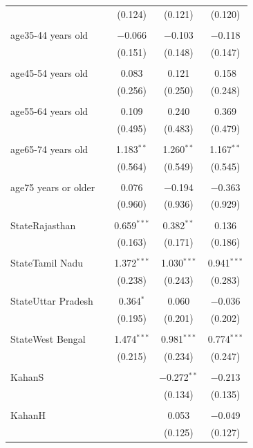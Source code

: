 \documentclass[
]{article}
\begin{document}
\begin{table}[!htbp]
\begin{tabular}{@{\extracolsep{5pt}}lcccc}
  &  & (0.124) & (0.121) & (0.120) \\ 
  & & & & \\ 
 age35-44 years old &  & $-$0.066 & $-$0.103 & $-$0.118 \\ 
  &  & (0.151) & (0.148) & (0.147) \\ 
  & & & & \\ 
 age45-54 years old &  & 0.083 & 0.121 & 0.158 \\ 
  &  & (0.256) & (0.250) & (0.248) \\ 
  & & & & \\ 
 age55-64 years old &  & 0.109 & 0.240 & 0.369 \\ 
  &  & (0.495) & (0.483) & (0.479) \\ 
  & & & & \\ 
 age65-74 years old &  & 1.183$^{**}$ & 1.260$^{**}$ & 1.167$^{**}$ \\ 
  &  & (0.564) & (0.549) & (0.545) \\ 
  & & & & \\ 
 age75 years or older &  & 0.076 & $-$0.194 & $-$0.363 \\ 
  &  & (0.960) & (0.936) & (0.929) \\ 
  & & & & \\ 
 StateRajasthan &  & 0.659$^{***}$ & 0.382$^{**}$ & 0.136 \\ 
  &  & (0.163) & (0.171) & (0.186) \\ 
  & & & & \\ 
 StateTamil Nadu &  & 1.372$^{***}$ & 1.030$^{***}$ & 0.941$^{***}$ \\ 
  &  & (0.238) & (0.243) & (0.283) \\ 
  & & & & \\ 
 StateUttar Pradesh &  & 0.364$^{*}$ & 0.060 & $-$0.036 \\ 
  &  & (0.195) & (0.201) & (0.202) \\ 
  & & & & \\ 
 StateWest Bengal &  & 1.474$^{***}$ & 0.981$^{***}$ & 0.774$^{***}$ \\ 
  &  & (0.215) & (0.234) & (0.247) \\ 
  & & & & \\ 
 KahanS &  &  & $-$0.272$^{**}$ & $-$0.213 \\ 
  &  &  & (0.134) & (0.135) \\ 
  & & & & \\ 
 KahanH &  &  & 0.053 & $-$0.049 \\ 
  &  &  & (0.125) & (0.127) \\ 

\end{tabular}
\end{table}
\end{document}
